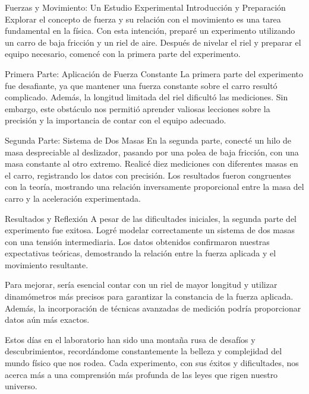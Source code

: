 \documentclass[journal]{IEEEtran}
\begin{document}
Fuerzas y Movimiento: Un Estudio Experimental
Introducción y Preparación
Explorar el concepto de fuerza y su relación con el movimiento es una tarea fundamental en la física. Con esta intención, preparé un experimento utilizando un carro de baja fricción y un riel de aire. Después de nivelar el riel y preparar el equipo necesario, comencé con la primera parte del experimento.

Primera Parte: Aplicación de Fuerza Constante
La primera parte del experimento fue desafiante, ya que mantener una fuerza constante sobre el carro resultó complicado. Además, la longitud limitada del riel dificultó las mediciones. Sin embargo, este obstáculo nos permitió aprender valiosas lecciones sobre la precisión y la importancia de contar con el equipo adecuado.

Segunda Parte: Sistema de Dos Masas
En la segunda parte, conecté un hilo de masa despreciable al deslizador, pasando por una polea de baja fricción, con una masa constante al otro extremo. Realicé diez mediciones con diferentes masas en el carro, registrando los datos con precisión. Los resultados fueron congruentes con la teoría, mostrando una relación inversamente proporcional entre la masa del carro y la aceleración experimentada.

Resultados y Reflexión
A pesar de las dificultades iniciales, la segunda parte del experimento fue exitosa. Logré modelar correctamente un sistema de dos masas con una tensión intermediaria. Los datos obtenidos confirmaron nuestras expectativas teóricas, demostrando la relación entre la fuerza aplicada y el movimiento resultante.

Para mejorar, sería esencial contar con un riel de mayor longitud y utilizar dinamómetros más precisos para garantizar la constancia de la fuerza aplicada. Además, la incorporación de técnicas avanzadas de medición podría proporcionar datos aún más exactos.

Estos días en el laboratorio han sido una montaña rusa de desafíos y descubrimientos, recordándome constantemente la belleza y complejidad del mundo físico que nos rodea. Cada experimento, con sus éxitos y dificultades, nos acerca más a una comprensión más profunda de las leyes que rigen nuestro universo.
\end{document}
